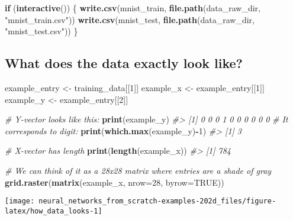 \documentclass[]{book}
\newenvironment{Shaded}{\begin{snugshade}}{\end{snugshade}}
\newcommand{\CommentTok}[1]{\textcolor[rgb]{0.56,0.35,0.01}{\textit{#1}}}
\newcommand{\ControlFlowTok}[1]{\textcolor[rgb]{0.13,0.29,0.53}{\textbf{#1}}}
\newcommand{\DataTypeTok}[1]{\textcolor[rgb]{0.13,0.29,0.53}{#1}}
\newcommand{\DecValTok}[1]{\textcolor[rgb]{0.00,0.00,0.81}{#1}}
\newcommand{\KeywordTok}[1]{\textcolor[rgb]{0.13,0.29,0.53}{\textbf{#1}}}
\newcommand{\NormalTok}[1]{#1}
\newcommand{\OperatorTok}[1]{\textcolor[rgb]{0.81,0.36,0.00}{\textbf{#1}}}
\newcommand{\OtherTok}[1]{\textcolor[rgb]{0.56,0.35,0.01}{#1}}
\newcommand{\StringTok}[1]{\textcolor[rgb]{0.31,0.60,0.02}{#1}}
\begin{document}
\begin{Shaded}
\begin{Highlighting}[]
\ControlFlowTok{if}\NormalTok{ (}\KeywordTok{interactive}\NormalTok{()) \{ }
  \KeywordTok{write.csv}\NormalTok{(mnist_train, }\KeywordTok{file.path}\NormalTok{(data_raw_dir, }\StringTok{"mnist_train.csv"}\NormalTok{))}
  \KeywordTok{write.csv}\NormalTok{(mnist_test, }\KeywordTok{file.path}\NormalTok{(data_raw_dir, }\StringTok{"mnist_test.csv"}\NormalTok{))}
\NormalTok{\}  }
\end{Highlighting}
\end{Shaded}

\hypertarget{what-does-the-data-exactly-look-like}{%
\subsection{What does the data exactly look like?}\label{what-does-the-data-exactly-look-like}}

\begin{Shaded}
\begin{Highlighting}[]
\NormalTok{example_entry <-}\StringTok{ }\NormalTok{training_data[[}\DecValTok{1}\NormalTok{]]}
\NormalTok{example_x <-}\StringTok{ }\NormalTok{example_entry[[}\DecValTok{1}\NormalTok{]]}
\NormalTok{example_y <-}\StringTok{ }\NormalTok{example_entry[[}\DecValTok{2}\NormalTok{]]}

\CommentTok{# Y-vector looks like this:}
\KeywordTok{print}\NormalTok{(example_y)}
\CommentTok{#>  [1] 0 0 0 1 0 0 0 0 0 0}
\CommentTok{# It corresponds to digit:}
\KeywordTok{print}\NormalTok{(}\KeywordTok{which.max}\NormalTok{(example_y)}\OperatorTok{-}\DecValTok{1}\NormalTok{)}
\CommentTok{#> [1] 3}

\CommentTok{# X-vector has length}
\KeywordTok{print}\NormalTok{(}\KeywordTok{length}\NormalTok{(example_x))}
\CommentTok{#> [1] 784}

\CommentTok{# We can think of it as a 28x28 matrix where entries are a shade of gray}
\KeywordTok{grid.raster}\NormalTok{(}\KeywordTok{matrix}\NormalTok{(example_x, }\DataTypeTok{nrow=}\DecValTok{28}\NormalTok{, }\DataTypeTok{byrow=}\OtherTok{TRUE}\NormalTok{))}
\end{Highlighting}
\end{Shaded}

\begin{center}\texttt{[image: neural\_networks\_from\_scratch-examples-202d\_files/figure-latex/how\_data\_looks-1]} \end{center}
\end{document}
